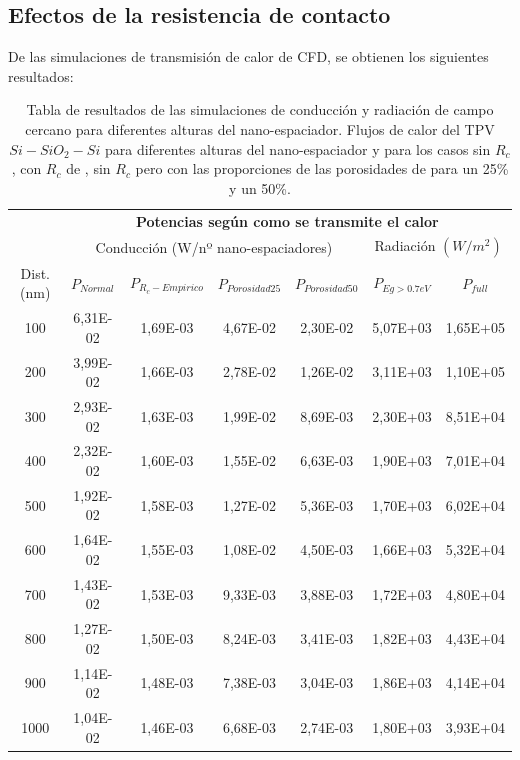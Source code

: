 \subsection{Efectos de la resistencia de contacto}

De las simulaciones de transmisión de calor de CFD, se obtienen los siguientes resultados:
\begin{table}[H]
	\centering
		\begin{tabular}{|c||c|c|c|c||c|c|}
		\hline
			\multirow{2}{*}{ }& \multicolumn{6}{c|}{\textbf{\large Potencias según como se transmite el calor}}\\ \cline{2-7}
		  & \multicolumn{4}{c||}{Conducción (W/nº nano-espaciadores)}& \multicolumn{2}{c|}{Radiación $(W/m^2)$}\\ \hline
			Dist. (nm)&$P_{Normal}$&$P_{R_c-Empirico}$&$P_{Porosidad25}$&$P_{Porosidad50}$&$P_{Eg>0.7eV}$&$P_{full}$\\ \hline \hline
			100&6,31E-02&1,69E-03&4,67E-02&2,30E-02&5,07E+03&1,65E+05\\ \hline
			200&3,99E-02&1,66E-03&2,78E-02&1,26E-02&3,11E+03&1,10E+05\\ \hline
			300&2,93E-02&1,63E-03&1,99E-02&8,69E-03&2,30E+03&8,51E+04\\ \hline
			400&2,32E-02&1,60E-03&1,55E-02&6,63E-03&1,90E+03&7,01E+04\\ \hline
			500&1,92E-02&1,58E-03&1,27E-02&5,36E-03&1,70E+03&6,02E+04\\ \hline
			600&1,64E-02&1,55E-03&1,08E-02&4,50E-03&1,66E+03&5,32E+04\\ \hline
			700&1,43E-02&1,53E-03&9,33E-03&3,88E-03&1,72E+03&4,80E+04\\ \hline
			800&1,27E-02&1,50E-03&8,24E-03&3,41E-03&1,82E+03&4,43E+04\\ \hline
			900&1,14E-02&1,48E-03&7,38E-03&3,04E-03&1,86E+03&4,14E+04\\ \hline
			1000&1,04E-02&1,46E-03&6,68E-03&2,74E-03&1,80E+03&3,93E+04\\ \hline
		\end{tabular}
	\caption{Tabla de resultados de las simulaciones de conducción y radiación de campo cercano para diferentes alturas del nano-espaciador. Flujos de calor del TPV $Si-SiO_2-Si$ para diferentes alturas del nano-espaciador y para los casos sin $R_c$, con $R_c$ de \cite{nf_TPV_Pillars_SiO2}, sin $R_c$ pero con las proporciones de las porosidades de \cite{ThermalConductivity_SiO2_2018} para un 25\% y un 50\%.}
	\label{tab:condTerSiSiO2Si}
\end{table}



